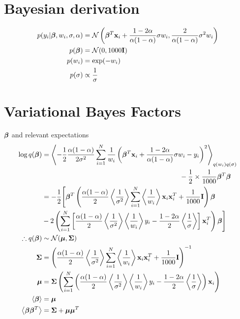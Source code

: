 \documentclass{article}
\begin{document}
\section{Bayesian derivation}
\begin{align}
p(y_i|\bm{\beta},w_i,\sigma,\alpha)&={\mathcal{N}}\left(\bm{\beta}^T\mathbf{x}_i+\frac{1-2\alpha}{\alpha(1-\alpha)}\sigma w_i,\frac{2}{\alpha(1-\alpha)}\sigma^2 w_i\right)\\
p(\bm{\beta})&={\mathcal{N}}(0,1000\mathbf{I})\\
p(w_i)&=\exp(-w_i)\\
p(\sigma)&\propto\frac{1}{\sigma}
\end{align}

\section{Variational Bayes Factors}
$\bm{\beta}$ and relevant expectations
\begin{align}
\nonumber
\log q(\bm{\beta})&=\left\langle-\frac{1}{2}\frac{\alpha(1-\alpha)}{2\sigma^2}\sum_{i=1}^{N}\frac{1}{w_i}\left(\bm{\beta}^T \mathbf{x}_i+\frac{1-2\alpha}{\alpha(1-\alpha)}\sigma w_i-y_i\right)^2\right\rangle_{q(w_i)q(\sigma)}\\
\nonumber
&\qquad\qquad\qquad\qquad\qquad\qquad\qquad\qquad\qquad\qquad-\frac{1}{2}\times\frac{1}{1000}\bm{\beta}^T\bm{\beta}\\
\nonumber
&=-\frac{1}{2}\Biggl[\bm{\beta}^T\left(\frac{\alpha(1-\alpha)}{2}\left\langle\frac{1}{\sigma^2}\right\rangle\sum_{i=1}^{N}\left\langle\frac{1}{w_i}\right\rangle\mathbf{x}_i\mathbf{x}_i^T+\frac{1}{1000}\mathbf{I}\right)\bm{\beta}\\
\nonumber
&-2\left(\sum_{i=1}^{N}\left[\frac{\alpha(1-\alpha)}{2}\left\langle\frac{1}{\sigma^2}\right\rangle\left\langle\frac{1}{w_i}\right\rangle y_i-\frac{1-2\alpha}{2}\left\langle\frac{1}{\sigma}\right\rangle\right]\mathbf{x}_i^T\right)\bm{\beta}\Biggr]\\
\therefore q(\bm{\beta})&\sim{\mathcal{N}}({\boldsymbol{\mu}},{\mathbf{\Sigma}})\\
{\mathbf{\Sigma}} &=\left(\frac{\alpha(1-\alpha)}{2}\left\langle\frac{1}{\sigma^2}\right\rangle\sum_{i=1}^{N}\left\langle\frac{1}{w_i}\right\rangle\mathbf{x}_i\mathbf{x}_i^T+\frac{1}{1000}\mathbf{I}\right)^{-1}\\
{\boldsymbol{\mu}}&={\mathbf{\Sigma}}\left(\sum_{i=1}^{N}\left(\frac{\alpha(1-\alpha)}{2}\left\langle\frac{1}{\sigma^2}\right\rangle\left\langle\frac{1}{w_i}\right\rangle y_i-\frac{1-2\alpha}{2}\left\langle\frac{1}{\sigma}\right\rangle\right)\mathbf{x}_i\right)\\
\left\langle\bm{\beta}\right\rangle&={\boldsymbol{\mu}}\\
\left\langle\bm{\beta}\bm{\beta}^T\right\rangle&={\mathbf{\Sigma}}+{\boldsymbol{\mu}}{\boldsymbol{\mu}}^T
\end{align}
\end{document}
